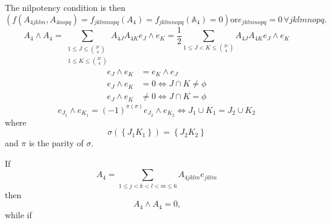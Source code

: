 \documentclass[aps, preprint]{revtex4}
\begin{document}
The nilpotency condition is then
\begin{equation}\left (f \left (A_{4 j k l m} ,A_{4 n o p q}\right ) =f_{j k l m n o p q} \left (A_{4}\right ) =f_{j k l m n o p q} \left (\mathbb{A}_{4}\right ) =0\right )\text{or}e_{j k l m n o p q} =0\, \forall j k l m n o p q\text{.}
\end{equation}
\begin{equation}A_{4} \wedge A_{4} ={\displaystyle\sum _{\begin{array}{c}1 \leq J \leq \binom{2 r}{4} \\
1 \leq K \leq \binom{2 r}{4}\end{array}}}A_{4 J} A_{4 K} e_{J} \wedge e_{K} =\frac{1}{2} {\displaystyle\sum _{1 \leq J <K \leq \binom{2 r}{4}}}A_{4 J} A_{4 K} e_{J} \wedge e_{K}
\end{equation}
\begin{align}e_{J} \wedge e_{K} &  =e_{K} \wedge e_{J} \\
e_{J} \wedge e_{K} &  =0 \Leftrightarrow J \cap K \neq \phi  \\
e_{J} \wedge e_{K} &  \neq 0 \Leftrightarrow J \cap K =\phi \end{align}
\begin{equation}e_{J_{1}} \wedge e_{K_{1}} =\left ( -1\right )^{\pi  \left (\sigma \right )} e_{J_{2}} \wedge e_{K_{2}} \Leftrightarrow J_{1} \cup K_{1} =J_{2} \cup K_{2}
\end{equation}where
\begin{equation}\sigma  \left (\left \{J_{1} K_{1}\right \}\right ) =\left \{J_{2} K_{2}\right \}
\end{equation}and $\pi $ is the parity of $\sigma \text{.}$ 

If
\begin{equation}A_{4} ={\displaystyle\sum _{1 \leq j <k <l <m \leq 6}}A_{4 j k l m} e_{j k l m}
\end{equation}then
\begin{equation}A_{4} \wedge A_{4} =0\text{,}
\end{equation}while if 
\end{document}
